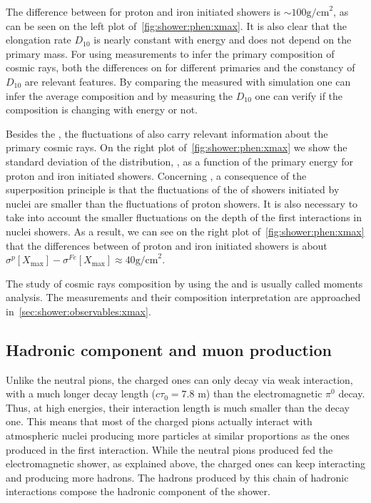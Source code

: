 The difference between \xmaxmean for
proton and iron initiated showers is $\sim 100 \text{g/cm}^2$, as can
be seen on the left plot of~\cref{fig:shower:phen:xmax}. It is also clear that the elongation rate
$D_{10}$ is nearly constant with energy and does not depend on the primary mass.
For using \xmax measurements to infer the primary composition of
cosmic rays, both the differences on \xmax for different primaries and
the constancy of $D_{10}$ are relevant features. By comparing the measured \xmaxmean
with simulation one can infer the average composition and by measuring
the $D_{10}$ one can verify if the composition is changing with energy or not. 


Besides the \xmaxmean, the fluctuations of \xmax also carry relevant information
about the primary cosmic rays. On the right plot of~\cref{fig:shower:phen:xmax}
we show the standard deviation of the \xmax distribution, \xmaxsig,
as a function of the primary energy for proton and iron initiated showers.
Concerning \xmaxsig, a consequence of the superposition principle
is that the fluctuations of the \xmax of showers initiated by nuclei
are smaller than the fluctuations of proton showers. It is also necessary
to take into account the smaller fluctuations on the depth of the first
interactions in nuclei showers. As a result,
we can see on the right plot of~\cref{fig:shower:phen:xmax}   
that the differences between \xmaxsig of proton and iron initiated showers is
about $\sigma^p[X_\text{max}]-\sigma^{Fe}[X_\text{max}] \approx 40 \text{g/cm}^2$.

The study of cosmic rays composition by using the \xmaxmean and \xmaxsig
is usually called \xmax moments analysis. The \xmax measurements
and their composition interpretation are approached in~\cref{sec:shower:observables:xmax}. 



\subsection{Hadronic component and muon production}
\label{sec:showers:phen:had}

Unlike the neutral pions, the charged ones can only decay via weak interaction,
with a much longer decay length ($c\tau_0=7.8$ m)
than the electromagnetic $\pi^0$ decay.  
Thus, at high energies, their interaction length
is much smaller than the decay one. This means that most
of the charged pions actually interact with atmospheric nuclei
producing more particles at similar proportions as the ones produced
in the first interaction. While the neutral pions produced
fed the electromagnetic shower, as explained above, the charged ones
can keep interacting and producing more hadrons. The hadrons
produced by this chain of hadronic interactions compose the
hadronic component of the shower.

